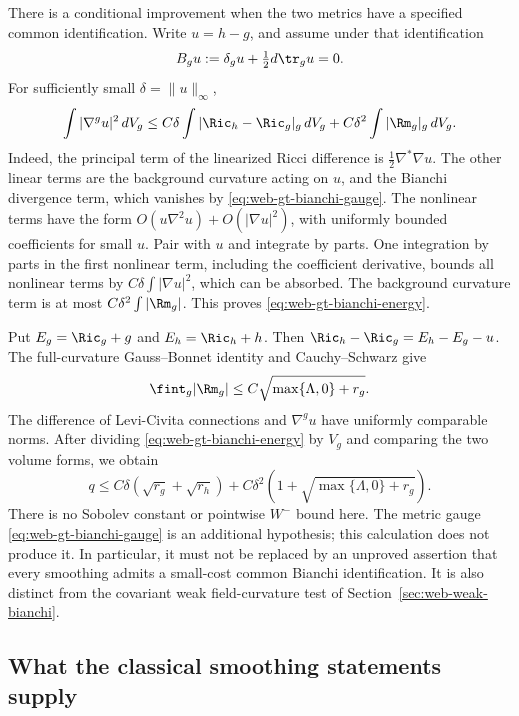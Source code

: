 There is a conditional improvement when the two metrics have a specified
common identification.  Write \(u=h-g\), and assume under that identification
\begin{equation}
 B_gu:=\delta_gu+\tfrac12d\tr_gu=0.
 \label{eq:web-gt-bianchi-gauge}
\end{equation}
For sufficiently small \(\delta=\|u\|_\infty\),
\begin{equation}
 \int|\nabla^gu|^2\,dV_g
 \le C\delta\int|\Ric_h-\Ric_g|_g\,dV_g
            +C\delta^2\int|\Rm_g|_g\,dV_g.
 \label{eq:web-gt-bianchi-energy}
\end{equation}
Indeed, the principal term of the linearized Ricci difference is
\(\tfrac12\nabla^*\nabla u\).  The other linear terms are the
background curvature acting on \(u\), and the Bianchi divergence term,
which vanishes by \eqref{eq:web-gt-bianchi-gauge}.  The nonlinear terms
have the form \(O(u\nabla^2u)+O(|\nabla u|^2)\), with uniformly bounded
coefficients for small \(u\).  Pair with \(u\) and integrate by parts.
One integration by parts in the first nonlinear term, including the
coefficient derivative, bounds all nonlinear terms by
\(C\delta\int|\nabla u|^2\), which can be absorbed.  The background
curvature term is at most \(C\delta^2\int|\Rm_g|\).  This proves
\eqref{eq:web-gt-bianchi-energy}.

Put \(E_g=\Ric_g+g\) and \(E_h=\Ric_h+h\).  Then
\(\Ric_h-\Ric_g=E_h-E_g-u\).  The full-curvature Gauss--Bonnet
identity and Cauchy--Schwarz give
\[
 \fint_g|\Rm_g|\le C\sqrt{\max\{\Lambda,0\}+r_g}.
\]
The difference of Levi-Civita connections and \(\nabla^gu\) have
uniformly comparable norms.  After dividing
\eqref{eq:web-gt-bianchi-energy} by \(V_g\) and comparing the two
volume forms, we obtain
\begin{equation}
 q\le C\delta(\sqrt{r_g}+\sqrt{r_h})
       +C\delta^2\left(1+\sqrt{\max\{\Lambda,0\}+r_g}\right).
 \label{eq:web-gt-bianchi-cost}
\end{equation}
There is no Sobolev constant or pointwise \(W^-\) bound here.  The
metric gauge \eqref{eq:web-gt-bianchi-gauge} is an additional hypothesis;
this calculation does not produce it.  In particular, it must not be
replaced by an unproved assertion that every smoothing admits a
small-cost common Bianchi identification.  It is also distinct from the
covariant weak field-curvature test of Section~\ref{sec:web-weak-bianchi}.

\subsection{What the classical smoothing statements supply}


